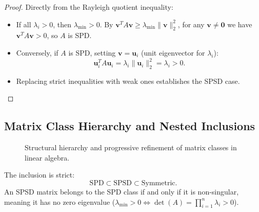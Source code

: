 \begin{proof}
Directly from the Rayleigh quotient inequality:
\begin{itemize}
    \item If all $\lambda_i > 0$, then $\lambda_{\min} > 0$. By $\mathbf{v}^T A \mathbf{v} \ge \lambda_{\min} \|\mathbf{v}\|_2^2$, for any $\mathbf{v} \neq \mathbf{0}$ we have $\mathbf{v}^T A \mathbf{v} > 0$, so $A$ is SPD.
    \item Conversely, if $A$ is SPD, setting $\mathbf{v} = \mathbf{u}_i$ (unit eigenvector for $\lambda_i$):
    \begin{equation}
        \mathbf{u}_i^T A \mathbf{u}_i = \lambda_i \|\mathbf{u}_i\|_2^2 = \lambda_i > 0.
    \end{equation}
    \item Replacing strict inequalities with weak ones establishes the SPSD case.
\end{itemize}
\end{proof}

\subsection{Matrix Class Hierarchy and Nested Inclusions}

\begin{figure}[H]
\centering
{}
\caption{Structural hierarchy and progressive refinement of matrix classes in linear algebra.}
\label{fig:matrix-hierarchy}
\end{figure}

The inclusion is strict:
\begin{equation}
    \text{SPD} \subset \text{SPSD} \subset \text{Symmetric}.
\end{equation}
An SPSD matrix belongs to the SPD class if and only if it is non-singular, meaning it has no zero eigenvalue ($\lambda_{\min} > 0 \iff \det(A) = \prod_{i=1}^n \lambda_i > 0$).

